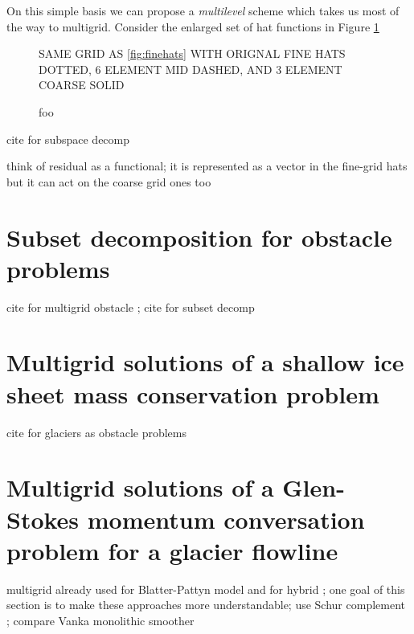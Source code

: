 \documentclass[letterpaper,final,12pt,reqno]{amsart}
\begin{document}
On this simple basis we can propose a \emph{multilevel} scheme which takes us most of the way to multigrid.  Consider the enlarged set of hat functions in Figure \ref{fig:multilevelhats}

\begin{figure}
SAME GRID AS \eqref{fig:finehats} WITH ORIGNAL FINE HATS DOTTED, 6 ELEMENT MID DASHED, AND 3 ELEMENT COARSE SOLID
\caption{foo}
\label{fig:multilevelhats}
\end{figure}

cite for subspace decomp \cite{Xu1992}

think of residual as a functional; it is represented as a vector in the fine-grid hats but it can act on the coarse grid ones too


\section{Subset decomposition for obstacle problems} \label{sec:obstacle}


cite for multigrid obstacle \cite{BrandtCryer1983,Bueler2021,GraeserKornhuber2009,Jouvetetal2013}; cite for subset decomp \cite{Tai2003}

\section{Multigrid solutions of a shallow ice sheet mass conservation problem} \label{sec:sia}

cite for glaciers as obstacle problems \cite{Bueler2016,Bueler2020,Calvoetal2002,JouvetBueler2012}

\section{Multigrid solutions of a Glen-Stokes momentum conversation problem for a glacier flowline} \label{sec:stokes}

multigrid already used for Blatter-Pattyn model \cite{BrownSmithAhmadia2013} and for hybrid \cite{Jouvetetal2013}; one goal of this section is to make these approaches more understandable; use Schur complement \cite{Bueler2021,Elmanetal2014}; compare Vanka monolithic smoother \cite{Farrelletal2019}

\small

\bigskip


\end{document}

